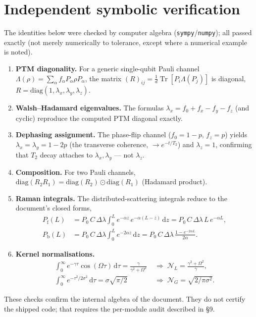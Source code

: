 \documentclass[11pt]{article}
\newcommand{\Tr}{\operatorname{Tr}}
\newcommand{\dd}{\mathrm{d}}
\begin{document}
\appendix
\section{Independent symbolic verification}
The identities below were checked by computer algebra (\texttt{sympy}/\texttt{numpy}); all
passed exactly (not merely numerically to tolerance, except where a numerical example is noted).

\begin{enumerate}[itemsep=2pt,topsep=2pt,leftmargin=1.5em]
\item \textbf{PTM diagonality.} For a generic single-qubit Pauli channel
$\Lambda(\rho)=\sum_\alpha f_\alpha P_\alpha\rho P_\alpha$, the matrix
$(R)_{ij}=\tfrac{1}{d}\Tr[P_i\Lambda(P_j)]$ is diagonal, $R=\mathrm{diag}(1,\lambda_x,\lambda_y,\lambda_z)$.
\item \textbf{Walsh--Hadamard eigenvalues.} The formulas
$\lambda_x=f_0+f_x-f_y-f_z$ (and cyclic) reproduce the computed PTM diagonal exactly.
\item \textbf{Dephasing assignment.} The phase-flip channel ($f_0=1-p,\,f_z=p$) yields
$\lambda_x=\lambda_y=1-2p$ (the transverse coherence, $\to e^{-t/T_2}$) and $\lambda_z=1$,
confirming that $T_2$ decay attaches to $\lambda_x,\lambda_y$ --- not $\lambda_z$.
\item \textbf{Composition.} For two Pauli channels, $\mathrm{diag}(R_2R_1)=\mathrm{diag}(R_2)\odot\mathrm{diag}(R_1)$
(Hadamard product).
\item \textbf{Raman integrals.} The distributed-scattering integrals reduce to the document's
closed forms,
\begin{align*}
P_{\mathrm{f}}(L) &= P_0\,C\,\Delta\lambda\!\int_0^L e^{-\alpha z}\,e^{-\alpha(L-z)}\,\dd z = P_0\,C\,\Delta\lambda\,L\,e^{-\alpha L},\\
P_{\mathrm{b}}(L) &= P_0\,C\,\Delta\lambda\!\int_0^L e^{-2\alpha z}\,\dd z
= P_0\,C\,\Delta\lambda\,\tfrac{1-e^{-2\alpha L}}{2\alpha}.
\end{align*}
\vspace{-0.3em}
\item \textbf{Kernel normalisations.}
\begin{align*}
\int_0^\infty e^{-\gamma\tau}\cos(\Omega\tau)\,\dd\tau=\frac{\gamma}{\gamma^2+\Omega^2}
&\;\Rightarrow\; \mathcal{N}_L=\frac{\gamma^2+\Omega^2}{\gamma},\\
\int_0^\infty e^{-\tau^2/2\sigma^2}\,\dd\tau=\sigma\sqrt{\pi/2}
&\;\Rightarrow\; \mathcal{N}_G=\sqrt{2/\pi\sigma^2}.
\end{align*}
\end{enumerate}
These checks confirm the internal algebra of the document. They do not certify the shipped
code; that requires the per-module audit described in \S9.
\end{document}

